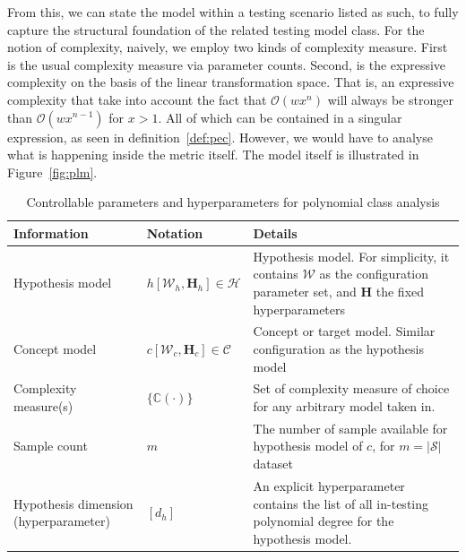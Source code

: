 \documentclass[
  journal=largetwo,
  year=2025,
  volume=37,
]{cup-journal}
\begin{document}
From this, we can state the model within a testing scenario listed as such, to fully capture the structural foundation of the related testing model class. For the notion of complexity, naively, we employ two kinds of complexity measure. First is the usual complexity measure via parameter counts. Second, is the expressive complexity on the basis of the linear transformation space. That is, an expressive complexity that take into account the fact that $\mathcal{O}(wx^{n})$ will always be stronger than $\mathcal{O}(wx^{n-1})$ for $x>1$. All of which can be contained in a singular expression, as seen in definition~\ref{def:pec}. However, we would have to analyse what is happening inside the metric itself. The model itself is illustrated in Figure~\ref{fig:plm}.

\begin{table}
  \centering
  \footnotesize
  \begin{threeparttable}
    \caption{Controllable parameters and hyperparameters for polynomial class analysis}
    \label{tab:polynomial_test}
    \begin{tabularx}{\textwidth}{ L{0.25\textwidth}
                                     L{0.2\textwidth}
                                     >{\RaggedRight\arraybackslash}X }
      \toprule
      \textbf{Information} & \textbf{Notation} & \textbf{Details} \\
      \midrule
      Hypothesis model
        & $h[\mathcal{W}_{h},\mathbf{H}_{h}]\in \mathcal{H}$
        & Hypothesis model. For simplicity, it contains $\mathcal{W}$ as the configuration parameter set, and $\mathbf{H}$ the fixed hyperparameters \\
      \addlinespace[1pt]
      Concept model
        & $c[\mathcal{W}_{c},\mathbf{H}_{c}]\in \mathcal{C}$
        & Concept or target model. Similar configuration as the hypothesis model \\
      \addlinespace[1pt]
      Complexity measure(s)
        & $\{\mathbb{C}(\cdot)\}$
        & Set of complexity measure of choice for any arbitrary model taken in. \\
      \addlinespace[1pt]
      Sample count
        & $m$
        & The number of sample available for hypothesis model of $c$, for $m=|\mathcal{S}|$ dataset\\
      \addlinespace[1pt]
      Hypothesis dimension (hyperparameter)
        & $[d_{h}]$
        & An explicit hyperparameter contains the list of all in-testing polynomial degree for the hypothesis model. \\

\end{tabularx}
\end{threeparttable}
\end{table}
\end{document}
